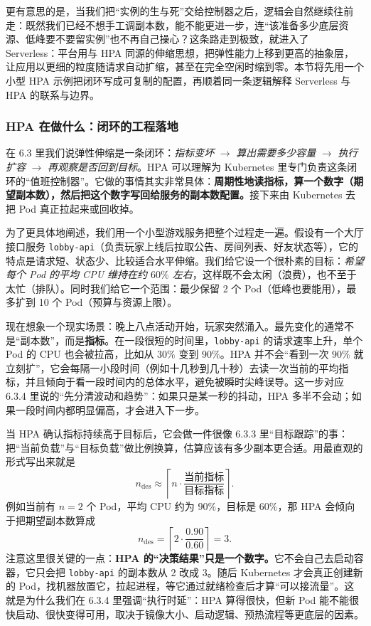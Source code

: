 更有意思的是，当我们把“实例的生与死”交给控制器之后，逻辑会自然继续往前走：既然我们已经不想手工调副本数，能不能更进一步，连“该准备多少底层资源、低峰要不要留实例”也不再自己操心？这条路走到极致，就进入了 Serverless：平台用与 HPA 同源的伸缩思想，把弹性能力上移到更高的抽象层，让应用以更细的粒度随请求自动扩缩，甚至在完全空闲时缩到零。本节将先用一个小型 HPA 示例把闭环写成可复制的配置，再顺着同一条逻辑解释 Serverless 与 HPA 的联系与边界。

\subsubsection{HPA 在做什么：闭环的工程落地}
在 6.3 里我们说弹性伸缩是一条闭环：\emph{指标变坏} $\rightarrow$ \emph{算出需要多少容量} $\rightarrow$ \emph{执行扩容} $\rightarrow$ \emph{再观察是否回到目标}。HPA 可以理解为 Kubernetes 里专门负责这条闭环的“值班控制器”。它做的事情其实非常具体：\textbf{周期性地读指标，算一个数字（期望副本数），然后把这个数字写回给服务的副本数配置。}接下来由 Kubernetes 去把 Pod 真正拉起来或回收掉。

为了更具体地阐述，我们用一个小型游戏服务把整个过程走一遍。假设有一个大厅接口服务 \texttt{lobby-api}（负责玩家上线后拉取公告、房间列表、好友状态等），它的特点是请求短、状态少、比较适合水平伸缩。我们给它设一个很朴素的目标：\emph{希望每个 Pod 的平均 CPU 维持在约 $60\%$ 左右}，这样既不会太闲（浪费），也不至于太忙（排队）。同时我们给它一个范围：最少保留 2 个 Pod（低峰也要能用），最多扩到 10 个 Pod（预算与资源上限）。

现在想象一个现实场景：晚上八点活动开始，玩家突然涌入。最先变化的通常不是“副本数”，而是\textbf{指标}。在一段很短的时间里，\texttt{lobby-api} 的请求速率上升，单个 Pod 的 CPU 也会被拉高，比如从 $30\%$ 变到 $90\%$。HPA 并不会“看到一次 $90\%$ 就立刻扩”，它会每隔一小段时间（例如十几秒到几十秒）去读一次当前的平均指标，并且倾向于看一段时间内的总体水平，避免被瞬时尖峰误导。这一步对应 6.3.4 里说的“先分清波动和趋势”：如果只是某一秒的抖动，HPA 多半不会动；如果一段时间内都明显偏高，才会进入下一步。

当 HPA 确认指标持续高于目标后，它会做一件很像 6.3.3 里“目标跟踪”的事：把“当前负载”与“目标负载”做比例换算，估算应该有多少副本更合适。用最直观的形式写出来就是
\[
n_{\mathrm{des}} \approx \left\lceil n \cdot \frac{\text{当前指标}}{\text{目标指标}}\right\rceil.
\]
例如当前有 $n=2$ 个 Pod，平均 CPU 约为 $90\%$，目标是 $60\%$，那 HPA 会倾向于把期望副本数算成
\[
n_{\mathrm{des}}=\left\lceil 2 \cdot \frac{0.90}{0.60}\right\rceil = 3.
\]
注意这里很关键的一点：\textbf{HPA 的“决策结果”只是一个数字。}它不会自己去启动容器，它只会把 \texttt{lobby-api} 的副本数从 2 改成 3。随后 Kubernetes 才会真正创建新的 Pod，找机器放置它，拉起进程，等它通过就绪检查后才算“可以接流量”。这就是为什么我们在 6.3.4 里强调“执行时延”：HPA 算得很快，但新 Pod 能不能很快启动、很快变得可用，取决于镜像大小、启动逻辑、预热流程等更底层的因素。

